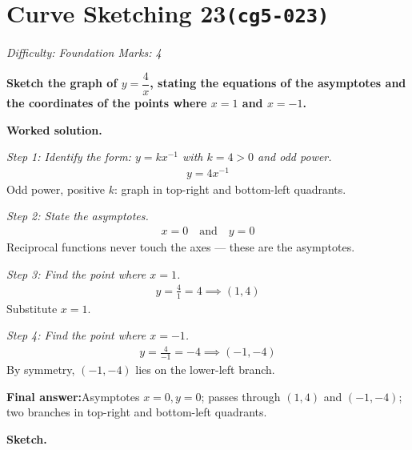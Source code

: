 \documentclass[11pt]{article}
\newcommand{\question}[1]{\par\medskip\noindent\textbf{#1}\par}
\begin{document}
\section*{Curve Sketching 23\quad\small\texttt{(cg5-023)}}
\textit{Difficulty: Foundation \quad\textbar\quad Marks: 4}

\question{Sketch the graph of \( y = \dfrac{4}{x} \), stating the equations of the asymptotes and the coordinates of the points where \( x = 1 \) and \( x = -1 \).}

\textbf{Worked solution.}

\textit{Step 1: Identify the form: \( y = kx^{-1} \) with \( k = 4 > 0 \) and odd power.}
\[\begin{gathered}
y = 4x^{-1}
\end{gathered}\]
Odd power, positive \( k \): graph in top-right and bottom-left quadrants.

\textit{Step 2: State the asymptotes.}
\[\begin{gathered}
x = 0 \quad \text{and} \quad y = 0
\end{gathered}\]
Reciprocal functions never touch the axes --- these are the asymptotes.

\textit{Step 3: Find the point where \( x = 1 \).}
\[\begin{gathered}
y = \frac{4}{1} = 4 \implies (1, 4)
\end{gathered}\]
Substitute \( x = 1 \).

\textit{Step 4: Find the point where \( x = -1 \).}
\[\begin{gathered}
y = \frac{4}{-1} = -4 \implies (-1, -4)
\end{gathered}\]
By symmetry, \( (-1, -4) \) lies on the lower-left branch.

\begin{answerbox}
\textbf{Final answer:}\quad Asymptotes \(\displaystyle x = 0, y = 0\); passes through \(\displaystyle (1, 4)\) and \(\displaystyle (-1, -4)\); two branches in top-right and bottom-left quadrants.
\end{answerbox}
\textbf{Sketch.}
\end{document}
